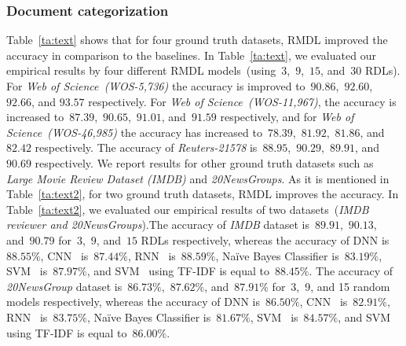 \documentclass[sigconf, final]{acmart}
\begin{document}
\subsubsection{Document categorization}
Table~\ref{ta:text} shows that for four ground truth datasets, RMDL improved the accuracy in comparison to the baselines. In Table~\ref{ta:text}, we evaluated our empirical results by four different RMDL models~(using~$3$,~$9$,~$15$, and~$30$ RDLs). For \textit{Web of Science~(WOS-5,736)} the accuracy is improved to~$90.86$,~$92.60$,~$92.66$, and $93.57$ respectively. For  \textit{Web of Science~(WOS-11,967)}, the accuracy is increased to~$87.39$,~$90.65$,~$91.01$, and~$91.59$ respectively, and for \textit{Web of Science~(WOS-46,985)} the accuracy has increased to~$78.39$,~$81.92$,~$81.86$, and~$82.42$ respectively. The accuracy of \textit{Reuters-21578} is~$88.95$,~$90.29$,~$89.91$, and~$90.69$ respectively. We report results for other ground truth datasets such as \textit{Large Movie Review Dataset (IMDB)} and \textit{20NewsGroups}. As it is mentioned in Table~\ref{ta:text2}, for two ground truth datasets, RMDL improves the accuracy. In Table~\ref{ta:text2}, we evaluated our empirical results of two datasets~(\textit{IMDB reviewer and 20NewsGroups}).The accuracy of \textit{IMDB} dataset is~$89.91$,~$90.13$, and~$90.79$ for~$3$,~$9$, and~$15$ RDLs respectively, whereas the accuracy of DNN is~$88.55\%$, CNN~\cite{yang2016hierarchical} is~$87.44\%$, RNN~\cite{yang2016hierarchical} is~$88.59\%$, Na\"{i}ve Bayes Classifier is~$83.19\%$, SVM~\cite{zhang2008text} is~$87.97\%$, and SVM~\cite{chen2016turning} using TF-IDF is equal to~$88.45\%$. The accuracy of \textit{20NewsGroup} dataset is~$86.73\%$,~$87.62\%$, and~$87.91\%$ for~3,~9, and 15 random models respectively, whereas the accuracy of DNN is~$86.50\%$, CNN~\cite{yang2016hierarchical} is~$82.91\%$, RNN~\cite{yang2016hierarchical} is~$83.75\%$, Na\"{i}ve Bayes Classifier is~$81.67\%$, SVM~\cite{zhang2008text} is~$84.57\%$, and SVM~\cite{chen2016turning} using TF-IDF is equal to~$86.00\%$.\\
\end{document}
